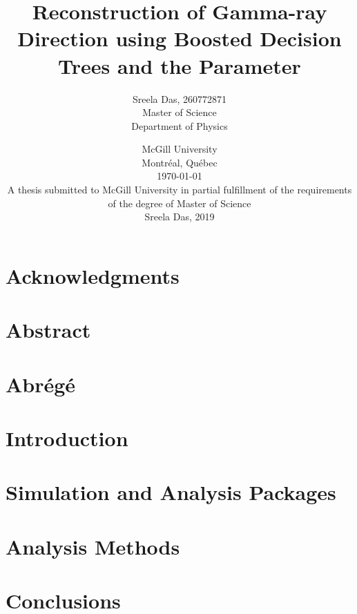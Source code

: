 \documentclass[openany, oneside, 12pt]{book}
\title{\Huge Reconstruction of Gamma-ray Direction using Boosted Decision Trees and the \disp Parameter \vspace{14pt}}
\author{\Large Sreela Das, 260772871 \\ \large Master of Science \\ \large Department of Physics \vspace{33pt}}
\date{\large McGill University \\ \large Montr\'eal, Qu\'ebec \\ \large \today \vspace{33pt}\\
  A thesis submitted to McGill University in partial fulfillment of the requirements of the degree of Master of Science\\ \vspace{30pt}\textcopyright \hspace{5pt}Sreela Das, 2019}
\begin{document}
\clearpage
\frontmatter
\renewcommand{\chaptermark}[1]{\markboth{\MakeUppercase{\chaptername\ \thechapter.\ #1}}{}}
\maketitle
\clearpage
{}
\raggedright
\chapter{Acknowledgments}

\clearpage
\chapter{Abstract}

\clearpage
\chapter{Abr\'eg\'e}

\clearpage
\tableofcontents
\listoffigures
\listoftables
\mainmatter
\raggedbottom

\setlength\parindent{24pt}
\setlength\parskip{10pt}
\pagestyle{plain}

\chapter{Introduction}


\chapter{Simulation and Analysis Packages}


\chapter{Analysis Methods}


% 

\chapter{Conclusions}



% 

% 

%  



\end{document}
